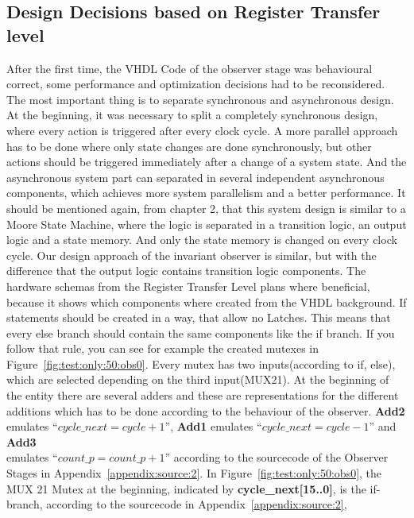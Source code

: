 \subsection{Design Decisions based on Register Transfer level}

After the first time, the VHDL Code of the observer stage was behavioural correct, some performance and optimization decisions had to be reconsidered. 
The most important thing is to separate synchronous and asynchronous design. At the beginning, it was necessary to split a completely synchronous design, where
every action is triggered after every clock cycle. A more parallel approach has to be done where only state changes are done synchronously, but other actions should
be triggered immediately after a change of a system state. And the asynchronous system part can separated in several independent asynchronous components, which achieves more 
system parallelism and a better performance. It should be mentioned again, from chapter 2, that this system design is similar to a Moore State Machine, where the logic 
is separated in a transition logic, an output logic and a state memory. And only the state memory is changed on every clock cycle. \newline
Our design approach of the invariant observer is similar, but with the difference that the output logic contains transition logic components. 
The hardware schemas from the Register Transfer Level plans where beneficial, because it shows which components where created from the VHDL background. 
If statements should be created in a way, that allow no Latches. This means that every else branch should contain the same components like the if branch. 
If you follow that rule, you can see for example the created mutexes in Figure~\ref{fig:test:only:50:obs0}. Every mutex has two inputs(according to if, else), which are
selected depending on the third input(MUX21). \newline
At the beginning of the entity there are several adders and these are representations for the different additions 
which has to be done according to the behaviour of the observer. \textbf{Add2} emulates ``$cycle\_next=cycle+1$'', \textbf{Add1} emulates ``$cycle\_next=cycle-1$'' and \textbf{Add3}\\ 
emulates ``$count\_p=count\_p+1$'' according to the sourcecode of the Observer Stages in Appendix~\ref{appendix:source:2}. 
In Figure~\ref{fig:test:only:50:obs0}, the MUX 21 Mutex at the beginning, indicated by \textbf{cycle\_next[15..0]}, is the if-branch, according to the sourcecode in Appendix~\ref{appendix:source:2}, 
